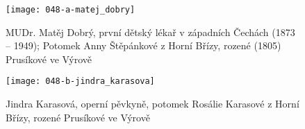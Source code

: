 \documentclass[../dejiny-rodu-prusiku.tex]{subfiles}
\begin{document}
\begin{figure}
\centering
\texttt{[image: 048-a-matej\_dobry]}
\caption{MUDr. Matěj Dobrý, první dětský lékař v západních Čechách (1873 – 1949);
Potomek Anny Štěpánkové z Horní Břízy, rozené (1805) Prusíkové ve Výrově}
\label{fig:048-a-matej_dobry}
\end{figure}

\begin{figure}
\centering
\texttt{[image: 048-b-jindra\_karasova]}
\caption{Jindra Karasová, operní pěvkyně, potomek Rosálie Karasové z Horní Břízy, rozené Prusíkové ve Výrově}
\label{fig:048-b-jindra_karasova}
\end{figure}
\end{document}
